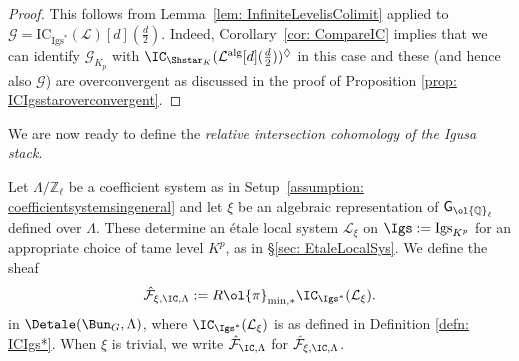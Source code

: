 \documentclass[letterpaper,11pt]{amsart}
\begin{document}
\begin{proof}
This follows from Lemma~\ref{lem: InfiniteLevelisColimit}  applied to $\mathcal{G}=\mathrm{IC}_{\mathrm{Igs}^*}(\mathcal{L})[d](\frac{d}{2})$. Indeed, Corollary~\ref{cor: CompareIC} implies that we can identify $\mathcal{G}_{K_p}$ with $\IC_{\Shstar_{K}}(\mathcal{L}^\mathrm{alg}[d](\frac{d}{2}))^\Diamond$ in this case and these (and hence also $\mathcal{G}$) are overconvergent as discussed in the proof of Proposition \ref{prop: ICIgsstaroverconvergent}. 
\end{proof}
We are now ready to define the \emph{relative intersection cohomology of the Igusa stack}. 

\begin{definition}\label{defn:FIC}
    Let $\Lambda/\mathbb{Z}_{\ell}$ be a coefficient system as in Setup~\ref{assumption: coefficientsystemsingeneral} and let $\xi$ be an algebraic representation of $\mathsf{G}_{\ol{\mathbb{Q}}_{\ell}}$  defined over $\Lambda$. These determine an \'etale local system $\mathcal{L}_{\xi}$ on $\Igs:=\mathrm{Igs}_{K^p}$ for an appropriate choice of tame level $K^p$, as in \S \ref{sec: EtaleLocalSys}. We define the sheaf 
    \[
    \hat{\mathcal{F}}_{\xi,\IC, \Lambda}:=R\ol{\pi}_{\min,*}\IC_{\Igs^*}(\mathcal{L}_{\xi}).
    \]
    in $\Detale(\Bun_G, \Lambda)$, where $\IC_{\Igs^{*}}(\mathcal{L}_{\xi})$ is as defined in Definition \ref{defn: ICIgs*}. When $\xi$ is trivial, we write $\hat{\mathcal{F}}_{\IC,\Lambda}$ for $\hat{\mathcal{F}}_{\xi,\IC,\Lambda}$. 
\end{definition}
\end{document}
